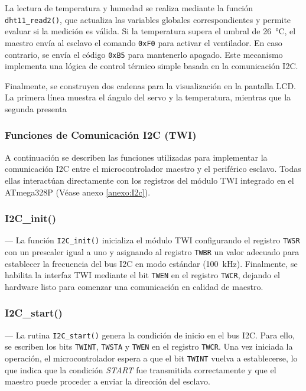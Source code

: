 La lectura de temperatura y humedad se realiza mediante la función \texttt{dht11\_read2()}, que actualiza las variables globales correspondientes y permite evaluar si la medición es válida. Si la temperatura supera el umbral de 26~°C, el maestro envía al esclavo el comando \texttt{0xF0} para activar el ventilador. En caso contrario, se envía el código \texttt{0xB5} para mantenerlo apagado. Este mecanismo implementa una lógica de control térmico simple basada en la comunicación I2C.

\vspace{1em}

Finalmente, se construyen dos cadenas para la visualización en la pantalla LCD. La primera línea muestra el ángulo del servo y la temperatura, mientras que la segunda presenta

\vspace{1em}
\subsubsection{Funciones de Comunicación I2C (TWI)}
A continuación se describen las funciones utilizadas para implementar la comunicación I2C entre el microcontrolador maestro y el periférico esclavo. Todas ellas interactúan directamente con los registros del módulo TWI integrado en el ATmega328P (Véase anexo \ref{anexo:I2c}).

\vspace{1em}
\subsubsection{I2C\_init()} ---
La función \texttt{I2C\_init()} inicializa el módulo TWI configurando el registro \texttt{TWSR} con un prescaler igual a uno y asignando al registro \texttt{TWBR} un valor adecuado para establecer la frecuencia del bus I2C en modo estándar (100~kHz). Finalmente, se habilita la interfaz TWI mediante el bit \texttt{TWEN} en el registro \texttt{TWCR}, dejando el hardware listo para comenzar una comunicación en calidad de maestro.

\vspace{1em}
\subsubsection{I2C\_start()} ---
La rutina \texttt{I2C\_start()} genera la condición de inicio en el bus I2C. Para ello, se escriben los bits \texttt{TWINT}, \texttt{TWSTA} y \texttt{TWEN} en el registro \texttt{TWCR}. Una vez iniciada la operación, el microcontrolador espera a que el bit \texttt{TWINT} vuelva a establecerse, lo que indica que la condición \textit{START} fue transmitida correctamente y que el maestro puede proceder a enviar la dirección del esclavo.

